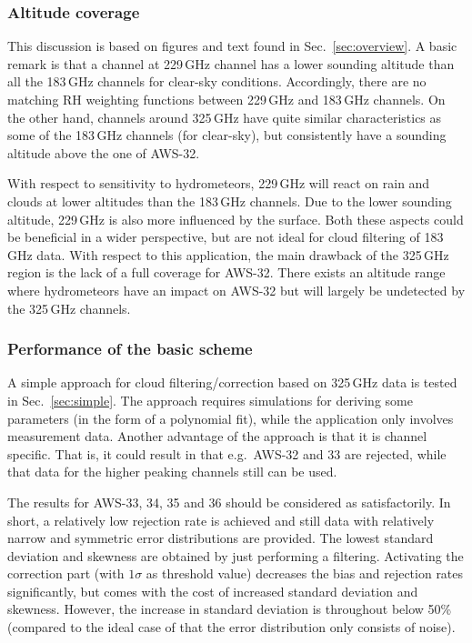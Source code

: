 \documentclass[12pt]{article}
\begin{document}
\subsubsection{Altitude coverage}
%
This discussion is based on figures and text found in Sec.~\ref{sec:overview}.
A basic remark is that a channel at 229\,GHz channel has a lower sounding
altitude than all the 183\,GHz channels for clear-sky conditions. Accordingly,
there are no matching RH weighting functions between 229\,GHz and 183\,GHz
channels. On the other hand, channels around 325\,GHz have quite similar
characteristics as some of the 183\,GHz channels (for clear-sky), but
consistently have a sounding altitude above the one of AWS-32.

With respect to sensitivity to hydrometeors, 229\,GHz will react on rain and
clouds at lower altitudes than the 183\,GHz channels. Due to the lower sounding
altitude, 229\,GHz is also more influenced by the surface. Both these aspects
could be beneficial in a wider perspective, but are not ideal for cloud
filtering of 183\,GHz data. With respect to this application, the main drawback
of the 325\,GHz region is the lack of a full coverage for AWS-32. There exists
an altitude range where hydrometeors have an impact on AWS-32 but will largely
be undetected by the 325\,GHz channels.


\subsubsection{Performance of the basic scheme}
%
A simple approach for cloud filtering/correction based on 325\,GHz data is
tested in Sec.~\ref{sec:simple}. The approach requires simulations for deriving
some parameters (in the form of a polynomial fit), while the application only
involves measurement data. Another advantage of the approach is that it is
channel specific. That is, it could result in that e.g.\ AWS-32 and 33 are
rejected, while that data for the higher peaking channels still can be used.

The results for AWS-33, 34, 35 and 36 should be considered as satisfactorily.
In short, a relatively low rejection rate is achieved and still data with
relatively narrow and symmetric error distributions are provided. The lowest
standard deviation and skewness are obtained by just performing a filtering.
Activating the correction part (with $1\sigma$ as threshold value) decreases
the bias and rejection rates significantly, but comes with the cost of
increased standard deviation and skewness. However, the increase in standard
deviation is throughout below 50\% (compared to the ideal case of that the
error distribution only consists of noise). 
\end{document}
